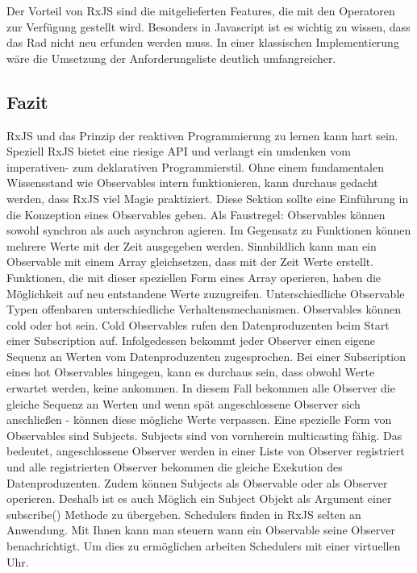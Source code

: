 \noindent
Der Vorteil von RxJS sind die mitgelieferten Features, die mit den Operatoren zur Verfügung gestellt wird. Besonders in Javascript ist es wichtig zu wissen, dass das Rad nicht neu erfunden werden muss. In einer klassischen Implementierung wäre die Umsetzung der Anforderungsliste deutlich umfangreicher. 

\subsection{Fazit}
RxJS und das Prinzip der reaktiven Programmierung zu lernen kann hart sein. Speziell RxJS bietet eine riesige API und verlangt ein umdenken vom imperativen- zum deklarativen Programmierstil. Ohne einem fundamentalen Wissensstand wie Observables intern funktionieren, kann durchaus gedacht werden, dass RxJS viel \glqq Magie\grqq{} praktiziert. Diese Sektion sollte eine Einführung in die Konzeption eines Observables geben. Als Faustregel: Observables können sowohl synchron als auch asynchron agieren. Im Gegensatz zu Funktionen können mehrere Werte mit der Zeit ausgegeben werden. Sinnbildlich kann man ein Observable mit einem Array gleichsetzen, dass mit der Zeit Werte erstellt. Funktionen, die mit dieser speziellen Form eines Array operieren, haben die Möglichkeit auf neu entstandene Werte zuzugreifen. Unterschiedliche Observable Typen offenbaren unterschiedliche Verhaltensmechanismen. Observables können cold oder hot sein. Cold Observables rufen den Datenproduzenten beim Start einer Subscription auf. Infolgedessen bekommt jeder Observer einen eigene Sequenz an Werten vom Datenproduzenten zugesprochen. Bei einer Subscription eines hot Observables hingegen, kann es durchaus sein, dass obwohl Werte erwartet werden, keine ankommen. In diesem Fall bekommen alle Observer die gleiche Sequenz an Werten und wenn spät angeschlossene Observer sich anschließen - können diese mögliche Werte verpassen. Eine spezielle Form von Observables sind Subjects. Subjects sind von vornherein multicasting fähig. Das bedeutet, angeschlossene Observer werden in einer Liste von Observer registriert und alle registrierten Observer bekommen die gleiche Exekution des Datenproduzenten. Zudem können Subjects als Observable oder als Observer operieren. Deshalb ist es auch Möglich ein Subject Objekt als Argument einer subscribe() Methode zu übergeben. Schedulers finden in RxJS selten an Anwendung. Mit Ihnen kann man steuern wann ein Observable seine Observer benachrichtigt. Um dies zu ermöglichen arbeiten Schedulers mit einer virtuellen Uhr.

